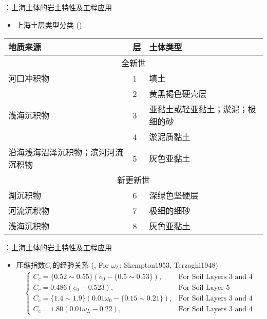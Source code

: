 \begin{frame}{\citet{Gao1986}：\href{run:./papers/Gao1986-Geotechnical properties of Shanghai soils and engineering applications.pdf}{上海土体的岩土特性及工程应用}}
    \begin{itemize}
        \item 上海土层类型分类 () 
    \end{itemize}
    
    \begin{table}
        \scriptsize
        \begin{tabular}{p{} p{} p{}}
            \toprule
            地质来源 & 层  & 土体类型 \\
            \midrule
            \multicolumn{3}{c}{全新世} \\
            \midrule
            河口冲积物 & 1  & 填土 \\
             & 2 &  黄黑褐色硬壳层 \\
            浅海沉积物 & 3 & 亚黏土或轻亚黏土；淤泥；极细的砂 \\
             & 4 & 淤泥质黏土 \\
            沿海浅海沼泽沉积物；滨河河流沉积物 & 5 & 灰色亚黏土\\
            \midrule
            \multicolumn{3}{c}{新更新世} \\
            \midrule
            湖沉积物 & 6 & 深绿色坚硬层 \\
            河流沉积物 & 7 & 极细的细砂 \\
            浅海沉积物 & 8 & 灰色亚黏土 \\
            \bottomrule
        \end{tabular}
    \end{table}
\end{frame}

\begin{frame}{\citet{Gao1986}：\href{run:./papers/Gao1986-Geotechnical properties of Shanghai soils and engineering applications.pdf}{上海土体的岩土特性及工程应用}}
    \begin{itemize}
        \item 压缩指数$C_c$的经验关系 (, For $\omega_L$: {Skempton1953}, {Terzaghi1948}) 
        \begin{align}
            \begin{cases}
                C_c=\{0.52\sim 0.55\}(e_0-\{0.5\sim 0.53\}),& \text{For Soil Layers 3 and 4} \\
                C_c=0.486(e_0-0.523),& \text{For Soil Layer 5} \\
                C_c=\{1.4\sim 1.9\}(0.01\omega_0-\{0.15\sim 0.21\}),& \text{For Soil Layers 3 and 4} \\
                C_c=1.80(0.01\omega_L-0.22),& \text{For Soil Layers 3 and 4}
            \end{cases}
        \end{align}
    \end{itemize}
\end{frame}

